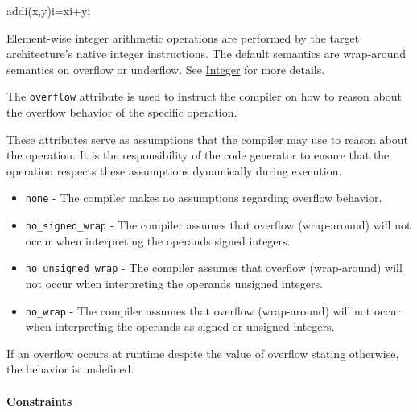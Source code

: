 \documentclass{article}
\begin{document}
addi(x,y)i=xi+yi

Element-wise integer arithmetic operations are performed by the target architecture's native integer instructions. The default semantics are wrap-around semantics on overflow or underflow. See \href{https://docs.nvidia.com/cuda/tile-ir/latest/sections/operations.html#op-group-integer}{Integer} for more details.


The \texttt{overflow} attribute is used to instruct the compiler on how to reason about the overflow behavior of the specific operation.


These attributes serve as assumptions that the compiler may use to reason about the operation. It is the responsibility of the code generator to ensure that the operation respects these assumptions dynamically during execution.


\begin{itemize}
\item \texttt{none} - The compiler makes no assumptions regarding overflow behavior.
\item \texttt{no\_signed\_wrap} - The compiler assumes that overflow (wrap-around) will not occur when interpreting the operands signed integers.
\item \texttt{no\_unsigned\_wrap} - The compiler assumes that overflow (wrap-around) will not occur when interpreting the operands unsigned integers.
\item \texttt{no\_wrap} - The compiler assumes that overflow (wrap-around) will not occur when interpreting the operands as signed or unsigned integers.

\end{itemize}
If an overflow occurs at runtime despite the value of overflow stating otherwise, the behavior is undefined.



\paragraph{Constraints}
\end{document}
